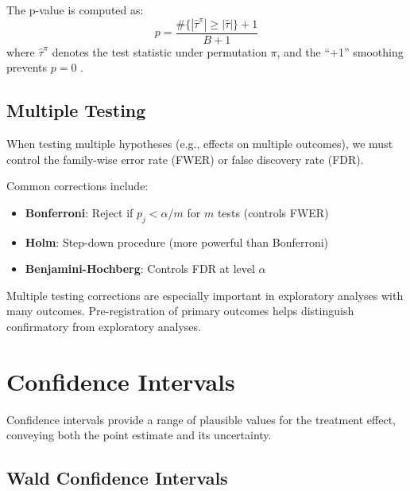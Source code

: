 The p-value is computed as:
\begin{equation}
p = \frac{\#\{|\hat{\tau}^{\pi}| \geq |\hat{\tau}|\} + 1}{B + 1}
\label{eq:perm_pvalue_ch3}
\end{equation}
where $\hat{\tau}^{\pi}$ denotes the test statistic under permutation $\pi$, and the ``+1'' smoothing prevents $p = 0$ \cite{phipson2010permutation}.

\subsection{Multiple Testing}

When testing multiple hypotheses (e.g., effects on multiple outcomes), we must control the family-wise error rate (FWER) or false discovery rate (FDR).

\begin{definition}
\label{def:multiple_testing}
Common corrections include:
\begin{itemize}
    \item \textbf{Bonferroni}: Reject if $p_j < \alpha/m$ for $m$ tests (controls FWER)
    \item \textbf{Holm}: Step-down procedure (more powerful than Bonferroni)
    \item \textbf{Benjamini-Hochberg}: Controls FDR at level $\alpha$
\end{itemize}
\end{definition}

\begin{insight}
Multiple testing corrections are especially important in exploratory analyses with many outcomes. Pre-registration of primary outcomes helps distinguish confirmatory from exploratory analyses.
\end{insight}


\section{Confidence Intervals}
\label{sec:confidence_intervals}

Confidence intervals provide a range of plausible values for the treatment effect, conveying both the point estimate and its uncertainty.

\subsection{Wald Confidence Intervals}


